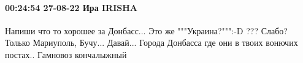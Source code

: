  
 
 
 
 

\paragraph{00:24:54 27-08-22 Ира IRISHA}

Напиши что то хорошее за Донбасс... Это же """Украина?""":-D ??? Слабо? Только
Мариуполь, Бучу... Давай... Города Донбасса где они в твоих вонючих постах..
Гамновоз кончалыжный
